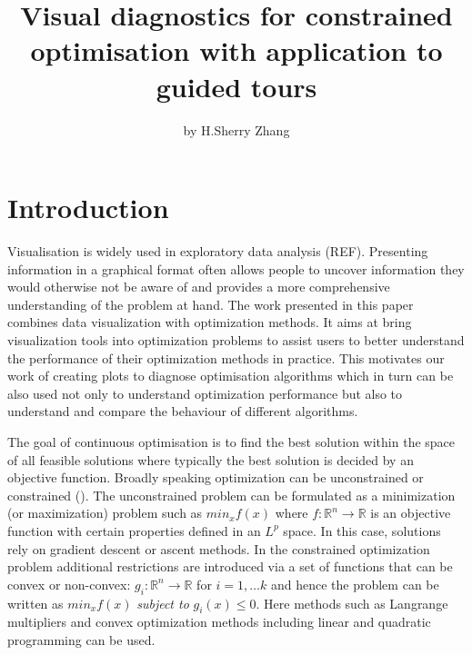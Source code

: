 \title{Visual diagnostics for constrained optimisation with application to guided tours}
\author{by H.Sherry Zhang}

\maketitle


\hypertarget{introduction}{%
\section{Introduction}\label{introduction}}

Visualisation is widely used in exploratory data analysis (REF). Presenting information in a graphical format often allows people to uncover information they would otherwise not be aware of and provides a more comprehensive understanding of the problem at hand. The work presented in this paper combines data visualization with optimization methods. It aims at bring visualization tools into optimization problems to assist users to better understand the performance of their optimization methods in practice. This motivates our work of creating plots to diagnose optimisation algorithms which in turn can be also used not only to understand optimization performance but also to understand and compare the behaviour of different algorithms.

The goal of continuous optimisation is to find the best solution within the space of all feasible solutions where typically the best solution is decided by an objective function. Broadly speaking optimization can be unconstrained or constrained (\citet{kelley1999iterative}). The unconstrained problem can be formulated as a minimization (or maximization) problem such as
\(min_{x} f(x)\) where \(f:\mathbb{R}^n \rightarrow \mathbb{R}\) is an objective function with certain properties defined in an \(L^p\) space. In this case, solutions rely on gradient descent or ascent methods. In the constrained optimization problem additional restrictions are introduced via a set of functions that can be convex or non-convex: \(g_i:\mathbb{R}^n \rightarrow \mathbb{R}\) for \(i = 1, \ldots k\) and hence the problem can be written as
\(min_{x} f(x)\) \emph{subject to} \(g_i(x) \leq 0\). Here methods such as Langrange multipliers and convex optimization methods including linear and quadratic programming can be used.

